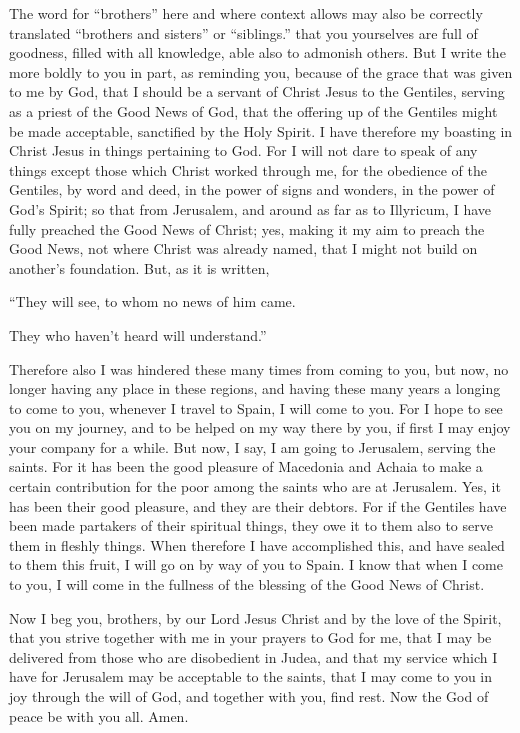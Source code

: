 {{The word for “brothers” here and where context allows may also be correctly translated “brothers and sisters” or “siblings.”} that you yourselves are full of goodness, filled with all knowledge, able also to admonish others.
But I write the more boldly to you in part, as reminding you, because of the grace that was given to me by God,
that I should be a servant of Christ Jesus to the Gentiles, serving as a priest of the Good News of God, that the offering up of the Gentiles might be made acceptable, sanctified by the Holy Spirit.
I have therefore my boasting in Christ Jesus in things pertaining to God.
For I will not dare to speak of any things except those which Christ worked through me, for the obedience of the Gentiles, by word and deed,
in the power of signs and wonders, in the power of God’s Spirit; so that from Jerusalem, and around as far as to Illyricum, I have fully preached the Good News of Christ;
yes, making it my aim to preach the Good News, not where Christ was already named, that I might not build on another’s foundation.
But, as it is written,
\par }{\Q “They will see, to whom no news of him came.
\par }{\QB They who haven’t heard will understand.”
\par }{\PP {}Therefore also I was hindered these many times from coming to you,
but now, no longer having any place in these regions, and having these many years a longing to come to you,
whenever I travel to Spain, I will come to you. For I hope to see you on my journey, and to be helped on my way there by you, if first I may enjoy your company for a while.
But now, I say, I am going to Jerusalem, serving the saints.
For it has been the good pleasure of Macedonia and Achaia to make a certain contribution for the poor among the saints who are at Jerusalem.
Yes, it has been their good pleasure, and they are their debtors. For if the Gentiles have been made partakers of their spiritual things, they owe it to them also to serve them in fleshly things.
When therefore I have accomplished this, and have sealed to them this fruit, I will go on by way of you to Spain.
I know that when I come to you, I will come in the fullness of the blessing of the Good News of Christ.
\par }{\PP {}Now I beg you, brothers, by our Lord Jesus Christ and by the love of the Spirit, that you strive together with me in your prayers to God for me,
that I may be delivered from those who are disobedient in Judea, and that my service which I have for Jerusalem may be acceptable to the saints,
that I may come to you in joy through the will of God, and together with you, find rest.
Now the God of peace be with you all. Amen.

}
